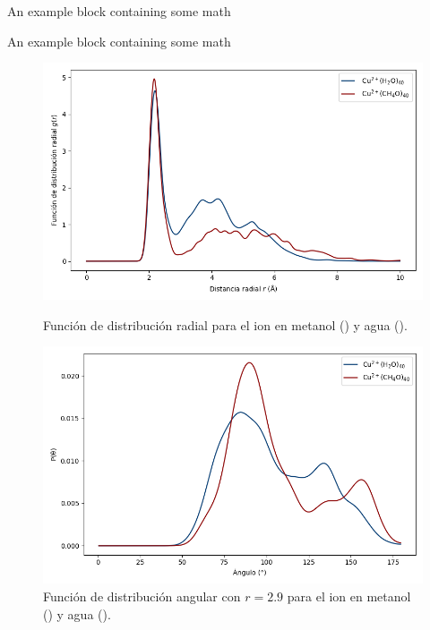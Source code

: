 \documentclass[final]{beamer}
\newlength{\colwidth}
\begin{document}
\begin{frame}[t]
\begin{columns}[t]
\begin{column}{\colwidth}
\begin{block}{An example block containing some math}{}
			\end{block}
			
			\begin{block}{An example block containing some math}{}
				
				\begin{figure}[H]
					\centering
					\begin{minipage}[c]{0.49\textwidth} %
						\centering
						\includegraphics[width=\textwidth]{logos/RDF-OUTPUT-HISTOGRAMA.png}
						\caption{Función de distribución radial para el ion  en metanol () y agua ().}
						\label{fig:rdfcu40ch4o}
					\end{minipage}%
					\hfill %
					\begin{minipage}[c]{0.49\textwidth} %
						\centering
						\includegraphics[width=\textwidth]{logos/ADF-OUTPUT-HISTOGRAMA.png}
						\caption{Función de distribución angular con $r = 2.9$ para el ion  en metanol () y agua ().}
						\label{fig:adfcu40ch4o}
					\end{minipage}
				\end{figure}


\end{block}
\end{column}
\end{columns}
\end{frame}
\end{document}
